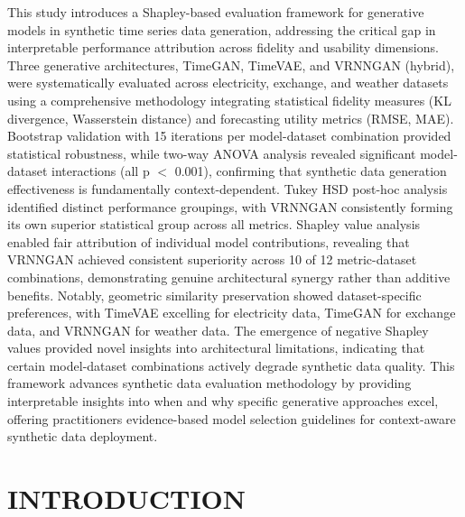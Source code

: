\documentclass{article}
\begin{document}
This study introduces a Shapley-based evaluation framework for generative models in synthetic time series data generation, addressing the critical gap in interpretable performance attribution across fidelity and usability dimensions. Three generative architectures, TimeGAN, TimeVAE, and VRNNGAN (hybrid), were systematically evaluated across electricity, exchange, and weather datasets using a comprehensive methodology integrating statistical fidelity measures (KL divergence, Wasserstein distance) and forecasting utility metrics (RMSE, MAE). Bootstrap validation with 15 iterations per model-dataset combination provided statistical robustness, while two-way ANOVA analysis revealed significant model-dataset interactions (all p $<$ 0.001), confirming that synthetic data generation effectiveness is fundamentally context-dependent. Tukey HSD post-hoc analysis identified distinct performance groupings, with VRNNGAN consistently forming its own superior statistical group across all metrics. Shapley value analysis enabled fair attribution of individual model contributions, revealing that VRNNGAN achieved consistent superiority across 10 of 12 metric-dataset combinations, demonstrating genuine architectural synergy rather than additive benefits. Notably, geometric similarity preservation showed dataset-specific preferences, with TimeVAE excelling for electricity data, TimeGAN for exchange data, and VRNNGAN for weather data. The emergence of negative Shapley values provided novel insights into architectural limitations, indicating that certain model-dataset combinations actively degrade synthetic data quality. This framework advances synthetic data evaluation methodology by providing interpretable insights into when and why specific generative approaches excel, offering practitioners evidence-based model selection guidelines for context-aware synthetic data deployment.

\newpage
\tableofcontents
\newpage

\listoffigures
\newpage

\listoftables
\newpage

\setcounter{page}{1}
\section{INTRODUCTION}
\end{document}
